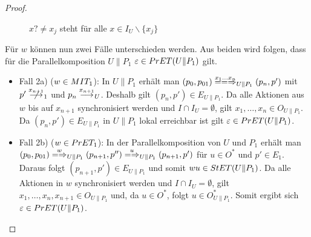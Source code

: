 \begin{proof}
\begin{itemize}
\begin{figure} [h!tbp]
\begin{center}
        \caption{$x?\neq x_j$ steht für alle $x\in I_U\backslash\{x_j\}$}
      \label{UohneE}
      \end{center}
      \end{figure}
      Für $w$ können nun zwei Fälle unterschieden werden. Aus beiden wird
      folgen, dass für die Parallelkomposition $U\|P_1$
      $\varepsilon\in PrET(U\|P_1)$ gilt.
      \begin{itemize}
        \item Fall 2a) ($w\in MIT _1$): In $U\|P_1$ erhält man $(p_0,p_{01})
          \lweakmay[x_1\dots x_n]_{U\|P_1} (p_n,p')$ mit $p'\nmust[x_{n+1}]_1$
          und $p_n\must[x_{n+1}]_U$. Deshalb gilt $(p_n,p')\in E_{U\|P_1}$. Da
          alle Aktionen aus $w$ bis auf $x_{n+1}$ synchronisiert werden und
          $I\cap I_U=\emptyset$, gilt $x_1,\dots , x_n\in O_{U\|P_1}$. Da
          $(p_n,p')\in E_{U\|P_1}$ in $U\|P_1$ lokal erreichbar ist gilt
          $\varepsilon\in PrET (U\|P_1)$.
        \item Fall 2b) ($w\in PrET _1$): In der Parallelkomposition von $U$ und
          $P_1$ erhält man $(p_0,p_{01}) \weakmay[w]_{U\|P_1} (p_{n+1},p'')
          \weakmay[u]_{U\|P_1} (p_{n+1},p')$ für $u\in O^*$ und $p'\in E_1$.
          Daraus folgt $(p_{n+1},p')\in E_{U\|P_1}$ und somit $wu\in StET
          (U\|P_1)$. Da alle Aktionen in $w$ synchronisiert werden und $I\cap
          I_U=\emptyset$, gilt $x_1,\dots ,x_n,x_{n+1}\in O_{U\|P_1}$ und, da
          $u\in O^*$, folgt $u\in O_{U\|P_1}^*$. Somit ergibt sich
          $\varepsilon\in PrET (U\|P_1)$.
      \end{itemize}

\end{itemize}
\end{proof}
